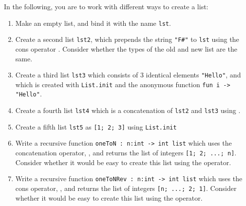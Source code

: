 In the following, you are to work with different ways to create a list:
\begin{enumerate}
\item Make an empty list, and bind it with the name \lstinline{lst}.
\item Create a second list \lstinline{lst2}, which prepends the string \lstinline{"F#"} to \lstinline{lst} using the cons operator \keyword{::}. Consider whether the types of the old and new list are the same.
\item Create a third list \lstinline{lst3} which consists of 3 identical elements \lstinline{"Hello"}, and which is created with \lstinline{List.init} and the anonymous function \lstinline{fun i -> "Hello"}.
\item Create a fourth list \lstinline{lst4} which is a concatenation of \lstinline{lst2} and \lstinline{lst3} using .
\item Create a fifth list \lstinline{lst5} as \lstinline{[1; 2; 3]} using \lstinline{List.init}
\item Write a recursive function \lstinline{oneToN : n:int -> int list} which uses the concatenation operator, , and returns the list of integers \lstinline{[1; 2; ...; n]}. Consider whether it would be easy to create this list using the \lexeme{::} operator.
\item Write a recursive function \lstinline{oneToNRev : n:int -> int list} which uses the cons operator, \lexeme{::}, and returns the list of integers \lstinline{[n; ...; 2; 1]}.  Consider whether it would be easy to create this list using the  operator.
\end{enumerate}
